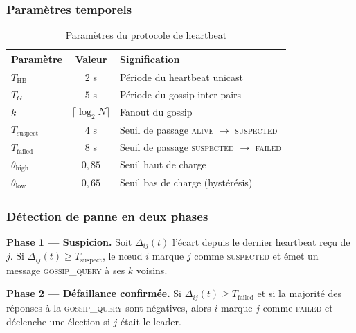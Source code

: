 \documentclass[12pt,a4paper]{report}
\theoremstyle{definition}
\begin{document}
\subsubsection{Paramètres temporels}

\begin{table}[H]
\centering
\caption{Paramètres du protocole de heartbeat}
\begin{tabular}{l c l}
\toprule
\textbf{Paramètre} & \textbf{Valeur} & \textbf{Signification} \\
\midrule
$T_{\mathrm{HB}}$ & $2$ s & Période du heartbeat unicast \\
$T_G$ & $5$ s & Période du gossip inter-pairs \\
$k$ & $\lceil \log_2 N \rceil$ & Fanout du gossip \\
$T_{\mathrm{suspect}}$ & $4$ s & Seuil de passage \textsc{alive} $\to$ \textsc{suspected} \\
$T_{\mathrm{failed}}$ & $8$ s & Seuil de passage \textsc{suspected} $\to$ \textsc{failed} \\
$\theta_{\mathrm{high}}$ & $0{,}85$ & Seuil haut de charge \\
$\theta_{\mathrm{low}}$ & $0{,}65$ & Seuil bas de charge (hystérésis) \\
\bottomrule
\end{tabular}
\end{table}

\subsubsection{Détection de panne en deux phases}

\textbf{Phase 1 --- Suspicion.} Soit $\Delta_{ij}(t)$ l'écart depuis le dernier heartbeat reçu de $j$. Si $\Delta_{ij}(t) \geq T_{\mathrm{suspect}}$, le nœud $i$ marque $j$ comme \textsc{suspected} et émet un message \textsc{gossip\_query} à ses $k$ voisins.

\textbf{Phase 2 --- Défaillance confirmée.} Si $\Delta_{ij}(t) \geq T_{\mathrm{failed}}$ et si la majorité des réponses à la \textsc{gossip\_query} sont négatives, alors $i$ marque $j$ comme \textsc{failed} et déclenche une élection si $j$ était le leader.
\end{document}
